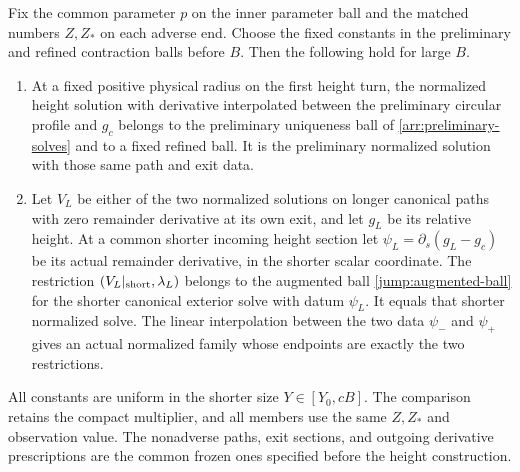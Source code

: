 \begin{proposition}
\label{jump:compatibility}
Fix the common parameter $p$ on the inner parameter ball and the
matched numbers $Z,Z_*$ on each adverse end.  Choose the fixed
constants in the preliminary and refined contraction balls before
$B$.  Then the following hold for large $B$.
\begin{enumerate}
 \item At a fixed positive physical radius on the first height
 turn, the normalized height solution with derivative interpolated
 between the preliminary circular profile and $g_c$ belongs to the preliminary uniqueness
 ball of \cref{arr:preliminary-solves} and to a fixed refined
 ball.  It is the preliminary normalized solution with those
 same path and exit data.
 \item Let $V_L$ be either of the two normalized solutions on
 longer canonical paths with zero remainder derivative at its own exit,
 and let $g_L$ be its relative height.
 At a common shorter incoming height section let
 $\psi_L=\partial_s(g_L-g_c)$ be its actual remainder derivative,
 in the shorter scalar coordinate.  The restriction
 $(V_L|_{\rm short},\lambda_L)$ belongs to the augmented ball
 \eqref{jump:augmented-ball} for the shorter canonical exterior
 solve with datum $\psi_L$.  It equals that shorter normalized
 solve.  The linear interpolation between the two data
 $\psi_-$ and $\psi_+$ gives an actual normalized family whose
 endpoints are exactly the two restrictions.
\end{enumerate}
All constants are uniform in the shorter size
$Y\in[Y_0,cB]$.  The comparison retains the compact multiplier,
and all members use the same $Z,Z_*$ and observation value.  The
nonadverse paths, exit sections, and outgoing derivative prescriptions
are the common frozen ones specified before the height construction.
\end{proposition}

